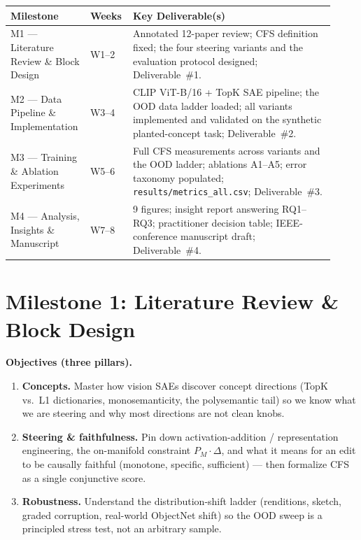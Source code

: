 \documentclass[11pt]{article}
\begin{document}
\vspace{0.4em}
\renewcommand{\arraystretch}{1.3}
\begin{center}
\begin{tabular}{@{}p{0.20\linewidth} p{0.12\linewidth} p{0.60\linewidth}@{}}
\toprule
\textbf{Milestone} & \textbf{Weeks} & \textbf{Key Deliverable(s)}\\
\midrule
M1 --- Literature Review \& Block Design & W1--2 &
  Annotated 12-paper review; CFS definition fixed; the four steering variants and the
  evaluation protocol designed; Deliverable~\#1.\\
M2 --- Data Pipeline \& Implementation & W3--4 &
  CLIP ViT-B/16 + TopK SAE pipeline; the OOD data ladder loaded; all variants
  implemented and validated on the synthetic planted-concept task; Deliverable~\#2.\\
M3 --- Training \& Ablation Experiments & W5--6 &
  Full CFS measurements across variants and the OOD ladder; ablations A1--A5; error
  taxonomy populated; \texttt{results/metrics\_all.csv}; Deliverable~\#3.\\
M4 --- Analysis, Insights \& Manuscript & W7--8 &
  9 figures; insight report answering RQ1--RQ3; practitioner decision table;
  IEEE-conference manuscript draft; Deliverable~\#4.\\
\bottomrule
\end{tabular}
\end{center}

\section{Milestone 1: Literature Review \& Block Design}

\textbf{Objectives (three pillars).}
\begin{enumerate}[leftmargin=1.4em,itemsep=2pt]
  \item \textbf{Concepts.} Master how vision SAEs discover concept directions (TopK vs.\
    L1 dictionaries, monosemanticity, the polysemantic tail) so we know what we are
    steering and why most directions are not clean knobs.
  \item \textbf{Steering \& faithfulness.} Pin down activation-addition / representation
    engineering, the on-manifold constraint $P_M\!\cdot\!\Delta$, and what it means for
    an edit to be causally faithful (monotone, specific, sufficient) --- then formalize
    CFS as a single conjunctive score.
  \item \textbf{Robustness.} Understand the distribution-shift ladder (renditions,
    sketch, graded corruption, real-world ObjectNet shift) so the OOD sweep is a
    principled stress test, not an arbitrary sample.
\end{enumerate}
\end{document}

